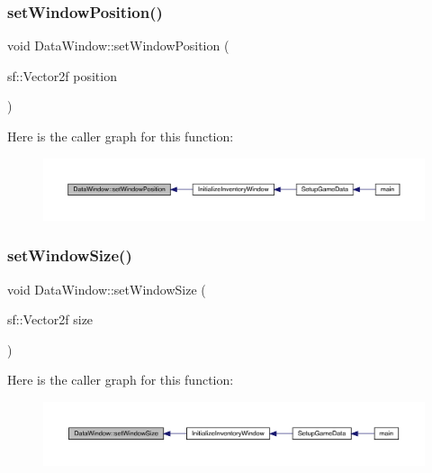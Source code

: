 \subsubsection{\texorpdfstring{set\+Window\+Position()}{setWindowPosition()}}
{\footnotesize\ttfamily void Data\+Window\+::set\+Window\+Position (\begin{DoxyParamCaption}\item[{sf\+::\+Vector2f}]{position }\end{DoxyParamCaption})}

Here is the caller graph for this function\+:
\nopagebreak
\begin{figure}[H]
\begin{center}
\leavevmode
\includegraphics[width=350pt]{d1/def/class_data_window_ab28e270817e9cdc56c78d9723c485d8f_icgraph}
\end{center}
\end{figure}
\mbox{\label{class_data_window_af883ff10816a9ad49b7b794c3e9f8f92}} 
\subsubsection{\texorpdfstring{set\+Window\+Size()}{setWindowSize()}}
{\footnotesize\ttfamily void Data\+Window\+::set\+Window\+Size (\begin{DoxyParamCaption}\item[{sf\+::\+Vector2f}]{size }\end{DoxyParamCaption})}

Here is the caller graph for this function\+:
\nopagebreak
\begin{figure}[H]
\begin{center}
\leavevmode
\includegraphics[width=350pt]{d1/def/class_data_window_af883ff10816a9ad49b7b794c3e9f8f92_icgraph}
\end{center}
\end{figure}
\mbox{\label{class_data_window_acd1f484d18f8f32d419d23e05e89ea31}} 
